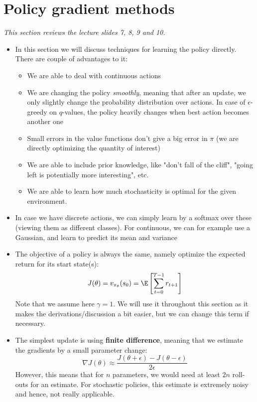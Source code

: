 \section{Policy gradient methods}
\label{sec:policy_learning}
\textit{This section reviews the lecture slides 7, 8, 9 and 10.}
\begin{itemize}
	\item In this section we will discuss techniques for learning the policy directly. There are couple of advantages to it:
	\begin{itemize}
		\item We are able to deal with continuous actions
		\item We are changing the policy \textit{smoothly}, meaning that after an update, we only slightly change the probability distribution over actions. In case of $\epsilon$-greedy on $q$-values, the policy heavily changes when best action becomes another one
		\item Small errors in the value functions don't give a big error in $\pi$ (we are directly optimizing the quantity of interest)
		\item We are able to include prior knowledge, like "don't fall of the cliff", "going left is potentially more interesting", etc.
		\item We are able to learn how much stochasticity is optimal for the given environment. 
	\end{itemize}
	\item In case we have discrete actions, we can simply learn by a softmax over these (viewing them as different classes). For continuous, we can for example use a Gaussian, and learn to predict its mean and variance
	\item The objective of a policy is always the same, namely optimize the expected return for its start state(s): $$J(\theta)=v_{\pi_{\theta}}(s_0)=\E\left[\sum_{t=0}^{T-1} r_{t+1}\right]$$
	Note that we assume here $\gamma=1$. We will use it throughout this section as it makes the derivations/discussion a bit easier, but we can change this term if necessary.
	\item The simplest update is using \textbf{finite difference}, meaning that we estimate the gradients by a small parameter change:
	$$\nabla J(\theta)\approx \frac{ J(\theta+\epsilon) - J(\theta-\epsilon)}{2\epsilon}$$
	However, this means that for $n$ parameters, we would need at least $2n$ roll-outs for an estimate. For stochastic policies, this estimate is extremely noisy and hence, not really applicable.
\end{itemize}
